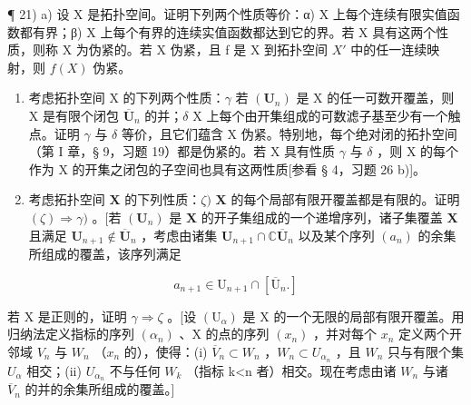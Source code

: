 ¶ 21) a) 设 X 是拓扑空间。证明下列两个性质等价：α) X 上每个连续有限实值函数都有界；β) X 上每个有界的连续实值函数都达到它的界。若 X 具有这两个性质，则称 X 为伪紧的。若 X 伪紧，且 f 是 X 到拓扑空间 \(X'\) 中的任一连续映射，则 \(f(X)\) 伪紧。

\begin{enumerate}
\def\labelenumi{\alph{enumi})}
\setcounter{enumi}{1}
\item
  考虑拓扑空间 X 的下列两个性质：\(\gamma\) 若 \((\mathbf{U}_n)\) 是 X 的任一可数开覆盖，则 X 是有限个闭包 \(\overline{\mathbf{U}}_n\) 的并；\(\delta\) X 上每个由开集组成的可数滤子基至少有一个触点。证明 \(\gamma\) 与 \(\delta\) 等价，且它们蕴含 X 伪紧。特别地，每个绝对闭的拓扑空间（第 I 章，§ 9，习题 19）都是伪紧的。若 X 具有性质 \(\gamma\) 与 \(\delta\) ，则 X 的每个作为 X 的开集之闭包的子空间也具有这两性质{[}参看 § 4，习题 26 b){]}。
\item
  考虑拓扑空间 \(\mathbf{X}\) 的下列性质：\(\zeta)\) \(\mathbf{X}\) 的每个局部有限开覆盖都是有限的。证明 \((\zeta) \Longrightarrow \gamma)\) 。{[}若 \((\mathbf{U}_n)\) 是 \(\mathbf{X}\) 的开子集组成的一个递增序列，诸子集覆盖 \(\mathbf{X}\) 且满足 \(\mathbf{U}_{n+1} \notin \overline{\mathbf{U}}_n\) ，考虑由诸集 \(\mathbf{U}_{n+1} \cap \mathbb{C}\overline{\mathbf{U}}_n\) 以及某个序列 \((a_n)\) 的余集所组成的覆盖，该序列满足
\end{enumerate}

\[
a _ {n + 1} \in \mathrm{U} _ {n + 1} \cap \left[ \overline {{\mathrm{U}}} _ {n}. \right]
\]

若 X 是正则的，证明 \(\gamma\Longrightarrow\zeta\) 。{[}设 \((\mathrm{U}_{\alpha})\) 是 X 的一个无限的局部有限开覆盖。用归纳法定义指标的序列 \((\alpha_{n})\) 、X 的点的序列 \((x_{n})\) ，并对每个 \(x_{n}\) 定义两个开邻域 \(V_{n}\) 与 \(W_{n}\) （\(x_{n}\) 的），使得：(i) \(\overline{V}_{n}\subset W_{n}\) ，\(W_{n}\subset U_{\alpha_{n}}\) ，且 \(W_{n}\) 只与有限个集 \(U_{\alpha}\) 相交；(ii) \(U_{\alpha_{n}}\) 不与任何 \(W_{k}\) （指标 k\textless n 者）相交。现在考虑由诸 \(W_{n}\) 与诸 \(\overline{V}_{n}\) 的并的余集所组成的覆盖。{]}

